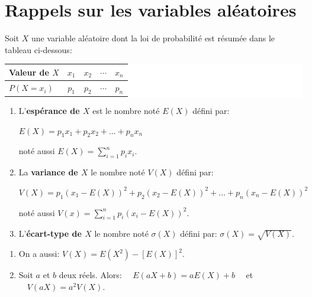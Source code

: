 \documentclass[a4paper,11pt,cours]{nsi} %
\begin{document}
\section{Rappels sur les variables aléatoires}
\begin{definition}
	Soit $X$ une variable aléatoire dont la loi de probabilité est résumée dans le tableau ci-dessous:
	\begin{center}
		\colorbox{white}{
			\begin{tabular}{|l|c|c|c|c|}
				\hline
				\textbf{{\boldmath Valeur de $X$}} & $x_1$ & $x_2$ & $\cdots$ & $x_n$\\
				\hline
				{\boldmath $P(X=x_i)$} & $p_1$ & $p_2$ & $\cdots$ & $p_n$\\
				\hline
		\end{tabular}}
	\end{center}
	
	\begin{enumerate}[label=\textbullet]
		\item	L'\textbf{{\boldmath espérance de $X$}} est le nombre noté {\boldmath $E(X)$} défini par:\\
		\centerline{{\boldmath $E(X)=p_1 x_1+p_2 x_2+\ldots+p_n x_n$}} 
		noté aussi {\boldmath $E(X)=\displaystyle \sum_{i=1}^{n} p_i x_i$}.
		\item La 	\textbf{{\boldmath variance de $X$}} le nombre noté {\boldmath $V(X)$} défini par:\\
		\centerline{{\boldmath $V(X)=p_1 \left(x_1-E(X)\right)^2+p_2 \left(x_2-E(X)\right)^2+\ldots+p_n \left(x_n-E(X)\right)^2$}}
		noté aussi {\boldmath $V(x)=\displaystyle \sum_{i=1}^{n} p_i\left(x_i-E(X)\right)^2$}.
		\item  L'\textbf{{\boldmath écart-type de $X$}} le nombre noté {\boldmath $\sigma(X)$} défini par: {\boldmath $\sigma(X)=\sqrt{V(X)}$}.
	\end{enumerate}
\end{definition}

\begin{propriete}[]
	\begin{enumerate}[label=\textbullet]
		\item 	On a aussi: {\boldmath $V(X)=E(X^2)-[E(X)]^2$}.
		\item 	Soit $a$ et $b$ deux réels. Alors: {\boldmath $\quad E(aX+b)=aE(X)+b\quad$ et 							$\quad V(aX)=a^2 V(X)$}.
	\end{enumerate}
\end{propriete}
\end{document}
